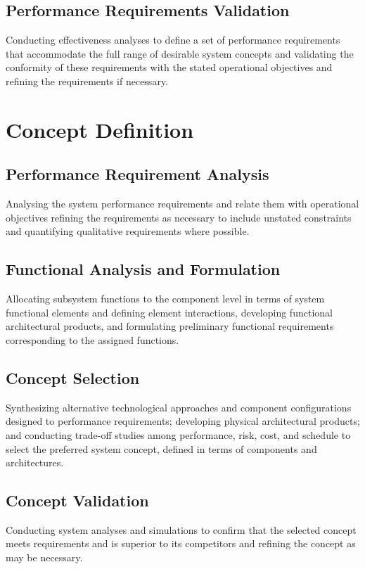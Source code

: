 \documentclass[a4paper,11pt,fleqn]{report}
\begin{document}
\subsection{Performance Requirements Validation}
Conducting effectiveness analyses to define a set of performance requirements that accommodate the full range of desirable system concepts and validating the conformity of these requirements with the stated operational objectives and refining the requirements if necessary. 

\section{Concept Definition}
\subsection{Performance Requirement Analysis}
Analysing the system performance requirements and relate them with operational objectives refining the requirements as necessary to include unstated constraints and quantifying qualitative requirements where possible. 

\subsection{Functional Analysis and Formulation} 
Allocating subsystem functions to the component level in terms of system functional elements and defining element interactions, developing functional architectural products, and formulating preliminary functional requirements corresponding to the assigned functions. 

\subsection{Concept Selection}
Synthesizing alternative technological approaches and component configurations designed to performance requirements; developing physical architectural products; and conducting trade-off studies among performance, risk, cost, and schedule to select the preferred system concept, defined in terms of components and architectures. 

\subsection{Concept Validation}
Conducting system analyses and simulations to confirm that the selected concept meets requirements and is superior to its competitors and refining the concept as may be necessary. 
\end{document}
